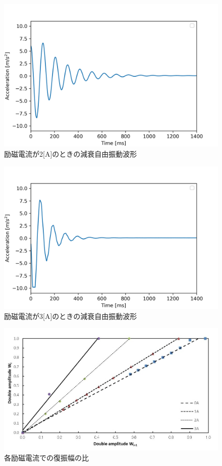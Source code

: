 \documentclass[a4paper,10.5pt]{jsarticle}
\begin{document}
\begin{figure}[h]
  \centering
  \includegraphics[width=13cm]{damp2.png}
  \caption{励磁電流が2[A]のときの減衰自由振動波形}
\end{figure}
\begin{figure}[h]
  \centering
  \includegraphics[width=13cm]{damp3.png}
  \caption{励磁電流が3[A]のときの減衰自由振動波形}
\end{figure}
\newpage
\begin{figure}[h]
  \centering
  \includegraphics[width=13cm]{5.png}
  \caption{各励磁電流での復振幅の比}
\end{figure}
\end{document}
